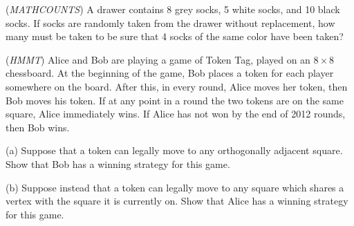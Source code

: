 \begin{problem}
(\textit{MATHCOUNTS}) A drawer contains 8 grey socks, 5 white socks, and 10 black socks. If socks are randomly taken from the drawer without replacement, how many must be taken to be sure that 4 socks of the same color have been taken?
\end{problem}

\begin{problem}
(\textit{HMMT}) Alice and Bob are playing a game of Token Tag, played on an $8\times8$ chessboard. At the beginning of the game, Bob places a token for each player somewhere on the board. After this, in every round, Alice moves her token, then Bob moves his token. If at any point in a round the two tokens are on the same square, Alice immediately wins. If Alice has not won by the end of 2012 rounds, then Bob wins.

(a) Suppose that a token can legally move to any orthogonally adjacent square. Show that Bob has a winning strategy for this game.

(b) Suppose instead that a token can legally move to any square which shares a vertex with the square it is currently on. Show that Alice has a winning strategy for this game.
\end{problem}